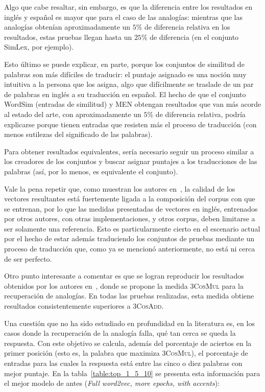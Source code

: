 Algo que cabe resaltar, sin embargo, es que la diferencia entre los resultados en inglés y español
es mayor que para el caso de las analogías: mientras que las analogías obtenían aproximadamente un
$5\%$ de diferencia relativa en los resultados, estas pruebas llegan hasta un $25\%$ de diferencia
(en el conjunto SimLex, por ejemplo).

Esto último se puede explicar, en parte, porque los conjuntos de similitud de palabras son más
difíciles de traducir: el puntaje asignado es una noción muy intuitiva a la persona que los asigna,
algo que difícilmente se traslade de un par de palabras en inglés a su traducción en español. El
hecho de que el conjunto WordSim (entradas de similitud) y MEN obtengan resultados que van más
acorde al estado del arte, con aproximadamente un $5\%$ de diferencia relativa, podría explicarse
porque tienen entradas que resisten más el proceso de traducción (con menos sutilezas del
significado de las palabras).

Para obtener resultados equivalentes, sería necesario seguir un proceso similar a los creadores de
los conjuntos y buscar asignar puntajes a los traducciones de las palabras (así, por lo menos, es
equivalente el conjunto).

Vale la pena repetir que, como muestran los autores en~\cite{Levy2015}, la calidad de los vectores
resultantes está fuertemente ligada a la composición del corpus con que se entrenan, por lo que las
medidas presentadas de vectores en inglés, entrenados por otros autores, con otras implementaciones,
y otros corpus, deben limitarse a ser solamente una referencia. Esto es particularmente cierto en el
escenario actual por el hecho de estar además traduciendo los conjuntos de pruebas mediante un
proceso de traducción que, como ya se mencionó anteriormente, no está ni cerca de ser perfecto.

Otro punto interesante a comentar es que se logran reproducir los resultados obtenidos por los
autores en~\cite{Levy2014b}, donde se propone la medida \textsc{3CosMul} para la recuperación de
analogías. En todas las pruebas realizadas, esta medida obtiene resultados consistentemente
superiores a \textsc{3CosAdd}.

Una cuestión que no ha sido estudiado en profundidad en la literatura es, en los casos donde la
recuperación de la analogía falla, qué tan cerca se queda la respuesta. Con este objetivo se
calcula, además del porcentaje de aciertos en la primer posición (esto es, la palabra que maximiza
\textsc{3CosMul}), el porcentaje de entradas para las cuales la respuesta está entre las cinco o
diez palabras con mejor puntaje. En la tabla~\ref{table:top_1_5_10} se presenta esta información
para el mejor modelo de antes (\textit{Full word2vec, more epochs, with accents}):

